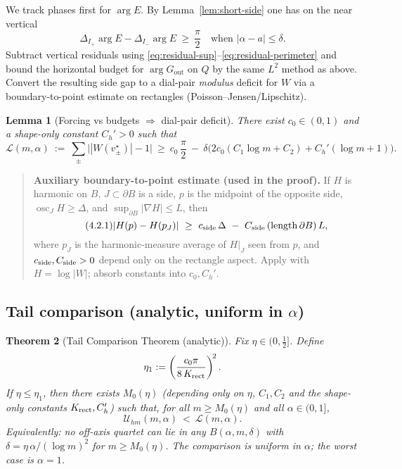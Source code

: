\documentclass[11pt]{article}
\numberwithin{equation}{section}
\newtheorem{theorem}{Theorem}[section]
\newtheorem{lemma}[theorem]{Lemma}
\theoremstyle{remark}
\newcommand{\osc}{\operatorname{osc}}
\newcommand{\Gout}{G_{\mathrm{out}}}
\begin{document}
We track phases first for $\arg E$. By Lemma~\ref{lem:short-side} one has on the near vertical
\[
\Delta_{I_+}\arg E - \Delta_{I_-}\arg E\ \ge\ \frac{\pi}{2}\quad\text{when }|\alpha-a|\le \delta.
\]
Subtract vertical residuals using \eqref{eq:residual-sup}--\eqref{eq:residual-perimeter} and bound the horizontal budget for $\arg\Gout$ on $Q$ by the same $L^2$ method as above. Convert the resulting side gap to a dial-pair \emph{modulus} deficit for $W$ via a boundary-to-point estimate on rectangles (Poisson--Jensen/Lipschitz).

\begin{lemma}[Forcing vs budgets $\Rightarrow$ dial-pair deficit]\label{lem:lower-envelope}
There exist $c_0\in(0,1)$ and a shape-only constant $C_h'>0$ such that
\begin{equation}\label{eq:lower}
\mathcal{L}(m,\alpha)\ :=\ \sum_{\pm}\big||W(v_\pm^\star)|-1\big|
\ \ge\ c_0\,\frac{\pi}{2}\ -\ \delta\Big(2c_0(C_1\log m+C_2)+C_h'(\log m+1)\Big).
\end{equation}
\end{lemma}

\begin{quote}\small
\textbf{Auxiliary boundary-to-point estimate (used in the proof).}
If $H$ is harmonic on $B$, $J\subset\partial B$ is a side, $p$ is the midpoint of the opposite side, $\osc_{J}H\ge\Delta$, and $\sup_{\partial B}|\nabla H|\le L$, then
\begin{equation}\tag{4.2.1}\label{eq:boundary-to-point}
|H(p)-H(p_J)|\ \ge\ c_{\rm side}\,\Delta\ -\ C_{\rm side}\,(\operatorname{length}\partial B)\,L,
\end{equation}
where $p_J$ is the harmonic-measure average of $H|_J$ seen from $p$, and $c_{\rm side},C_{\rm side}>0$ depend only on the rectangle aspect. Apply with $H=\log|W|$; absorb constants into $c_0,C_h'$.
\end{quote}

\subsection{Tail comparison (analytic, uniform in \texorpdfstring{$\alpha$}{alpha})}\label{subsec:comparison}

\begin{theorem}[Tail Comparison Theorem (analytic)]\label{thm:tail}
Fix $\eta\in(0,\tfrac12]$. Define
\[
\eta_1:=\left(\frac{c_0\pi}{8\,K_{\rm rect}}\right)^{\!2}.
\]
If $\eta\le\eta_1$, then there exists $M_0(\eta)$ (depending only on $\eta$, $C_1,C_2$ and the shape-only constants $K_{\rm rect},C_h'$) such that, for all $m\ge M_0(\eta)$ and all $\alpha\in(0,1]$,
\[
\mathcal{U}_{\!hm}(m,\alpha)\ <\ \mathcal{L}(m,\alpha).
\]
Equivalently: no off-axis quartet can lie in any $B(\alpha,m,\delta)$ with $\delta=\eta\,\alpha/(\log m)^2$ for $m\ge M_0(\eta)$. The comparison is uniform in $\alpha$; the worst case is $\alpha=1$.
\end{theorem}
\end{document}
